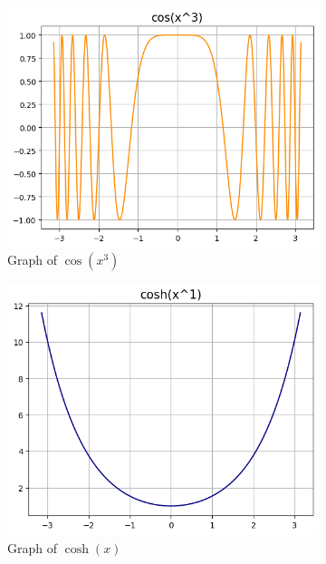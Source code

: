 \documentclass{article}
\begin{document}
\begin{figure}[h!]
\begin{subfigure}[t]{0.3\textwidth}
            \includegraphics[width=\textwidth]{params/cos-x3.png}
            \caption{Graph of $\cos(x^3)$}
            \label{fig:cos-x3}
        \end{subfigure}
        \newline
        \begin{subfigure}[t]{0.3\textwidth}
            \includegraphics[width=\textwidth]{params/cosh-x1.png}
            \caption{Graph of $\cosh(x)$}
            \label{fig:cosh-x1}
        \end{subfigure}
        \hfill
        \begin{subfigure}[t]{0.3\textwidth}

\end{subfigure}
\end{figure}
\end{document}
